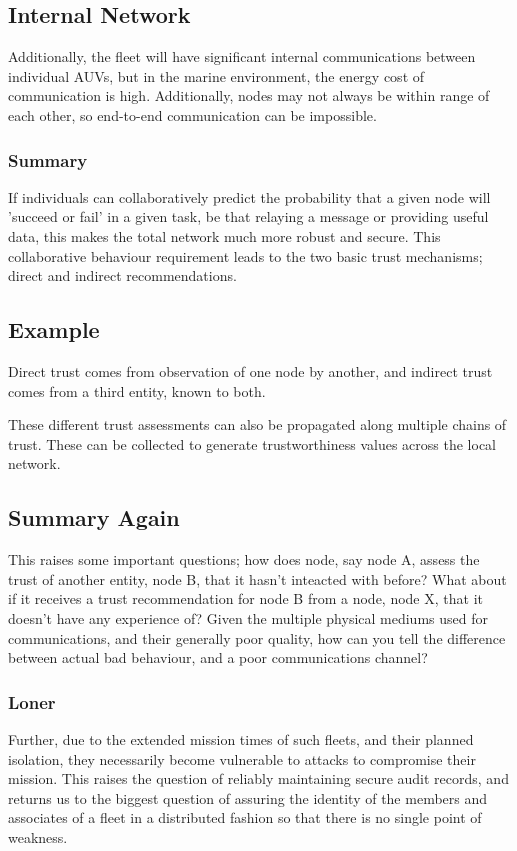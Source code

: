 \documentclass[oneside,11pt,a4paper]{Latex/Classes/PhDthesisPSnPDF}
\begin{document}
\begin{doublespace}
\subsection{Internal Network}
Additionally, the fleet will have significant internal communications between
individual AUVs, but in the marine environment, the energy cost of 
communication is high. Additionally, nodes may not always be within range of 
each other, so end-to-end communication can be impossible.

\subsubsection{Summary} If individuals can collaboratively predict
the probability that a given node will 'succeed or fail' in a given task, be that relaying a message
or providing useful data, this makes the total network much more robust and
secure. This collaborative behaviour requirement leads to the two basic trust
mechanisms; direct and indirect recommendations. 

\subsection{Example}
Direct trust comes from observation of one node by another, and indirect trust 
comes from a third entity, known to both.

These different trust assessments can also be propagated along
multiple chains of trust. These can be collected to generate trustworthiness
values across the local network.

\subsection{Summary Again}
This raises some important questions;
how does node, say node A, assess the trust of another entity, node B, that it 
hasn't inteacted with before?  What about if it receives a trust recommendation 
for node B from a node, node X, that it doesn't have any experience of? Given 
the multiple physical mediums used for communications, and their generally poor 
quality, how can you tell the difference between actual bad behaviour, and a 
poor communications channel?

\subsubsection{Loner}  Further, due to the extended mission times of such
fleets, and their planned isolation, they necessarily become vulnerable to 
attacks to compromise their mission.  This raises the question of reliably 
maintaining secure audit records, and returns us to the biggest question of 
assuring the identity of the members and associates of a fleet in a distributed 
fashion so that there is no single point of weakness.


\end{doublespace}
\end{document}

